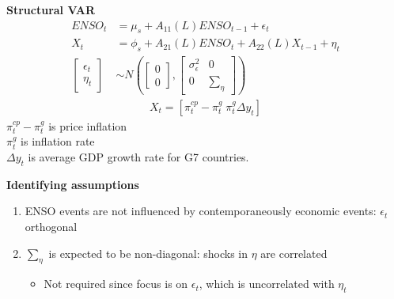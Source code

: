 \documentclass{beamer}
\begin{document}
\begin{frame}
 \textbf{Structural VAR}\\
   \begin{align}
    ENSO_t &= \mu_s +A_{11}(L)ENSO_{t-1} + \epsilon_t\\ \nonumber
    X_t &= \phi_s + A_{21}(L)ENSO_t + A_{22}(L)X_{t-1} + \eta_t\\
    \begin{bmatrix}      \epsilon_t \\ \eta_t    \end{bmatrix}
    &\sim N \left ( \begin{bmatrix} 0 \\ 0 \end{bmatrix},
    \begin{bmatrix} \sigma^2_{\epsilon} & 0 \\ 0 & \sum_{\eta} \end{bmatrix}
     \right)
  \end{align}
  \begin{align}
    X_t=[\pi^{cp}_t-\pi^g_t\; \pi^g_t \Delta y_t]
  \end{align}
  $\pi^{cp}_t-\pi^g_t$ is price inflation\\
  $\pi^g_t$ is inflation rate\\
  $\Delta y_t$ is average GDP growth rate for G7 countries.

\end{frame}

\begin{frame}
  \textbf{Identifying assumptions}
  \begin{enumerate}
    \item ENSO events are not influenced by contemporaneously economic events: $\epsilon_t$ orthogonal    
    \item $\sum_{\eta}$ is expected to be non-diagonal: shocks in $\eta$ are correlated
    \begin{itemize}
      \item Not required since focus is on $\epsilon_t$, which is uncorrelated with $\eta_t$
    \end{itemize}
  \end{enumerate}
\end{frame}
\end{document}
